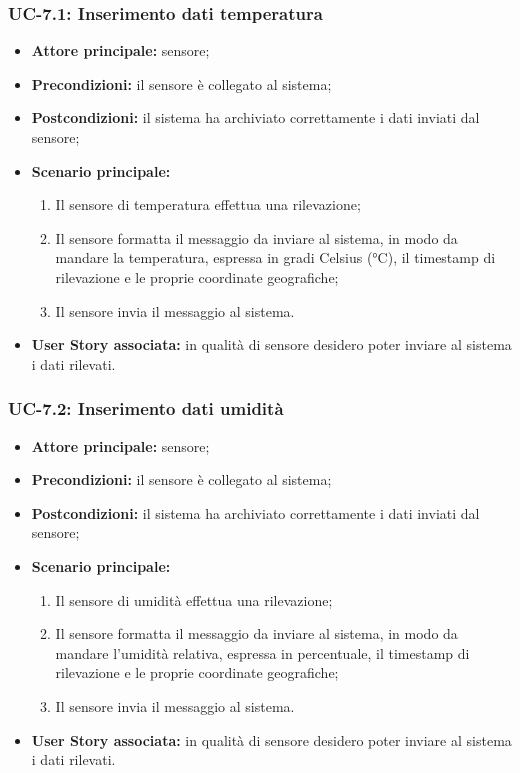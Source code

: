 \documentclass[8pt]{article}
\begin{document}
\subsubsection*{UC-7.1: Inserimento dati temperatura}
\begin{itemize}
    \item \textbf{Attore principale:} sensore;
    \item \textbf{Precondizioni:} il sensore è collegato al sistema;
    \item \textbf{Postcondizioni:} il sistema ha archiviato correttamente i dati inviati dal sensore;
    \item \textbf{Scenario principale:}
        \begin{enumerate}
        \item Il sensore di temperatura effettua una rilevazione;
        \item Il sensore formatta il messaggio da inviare al sistema, in modo da mandare la
temperatura, espressa in gradi Celsius (°C), il timestamp di rilevazione e le proprie
coordinate geografiche;
        \item Il sensore invia il messaggio al sistema.
        \end{enumerate}
    \item \textbf{User Story associata:} in qualità di sensore desidero poter inviare al sistema i
        dati rilevati.
\end{itemize}
\subsubsection*{UC-7.2: Inserimento dati umidità}
\begin{itemize}
    \item \textbf{Attore principale:} sensore;
    \item \textbf{Precondizioni:} il sensore è collegato al sistema;
    \item \textbf{Postcondizioni:} il sistema ha archiviato correttamente i dati inviati dal sensore;
    \item \textbf{Scenario principale:}
        \begin{enumerate}
        \item Il sensore di umidità effettua una rilevazione;
        \item Il sensore formatta il messaggio da inviare al sistema, in modo da mandare l'umidità
            relativa, espressa in percentuale, il timestamp di rilevazione e le proprie
coordinate geografiche;
        \item Il sensore invia il messaggio al sistema.
        \end{enumerate}
    \item \textbf{User Story associata:} in qualità di sensore desidero poter inviare al sistema i
        dati rilevati.
\end{itemize}
\end{document}
